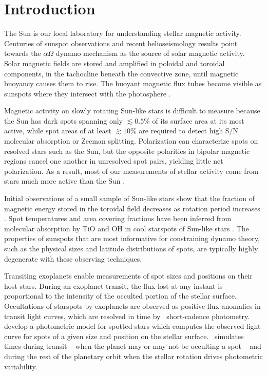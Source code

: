 

\section{Introduction}

The Sun is our local laboratory for understanding stellar magnetic activity. Centuries of sunspot observations and recent helioseismology results point towards the $\alpha\Omega$ dynamo mechanism as the source of solar magnetic activity. Solar magnetic fields are stored and amplified in poloidal and toroidal components, in the tachocline beneath the convective zone, until magnetic buoyancy causes them to rise. The buoyant magnetic flux tubes become visible as sunspots where they intersect with the photosphere \citetext{\citealp{Parker1955a, Parker1955b, Babcock1961}; \citealp[see reviews by][]{Charbonneau2010, Cheung2014, Hathaway2015}}. 

Magnetic activity on slowly rotating Sun-like stars is difficult to measure \citep{Saar1990} because the Sun has dark spots spanning only $\lesssim 0.5\%$ of its surface area at its most active, while spot areas of at least $\gtrsim 10\%$ are required to detect high S/N molecular absorption or Zeeman splitting. Polarization can characterize spots on resolved stars such as the Sun, but the opposite polarities in bipolar magnetic regions cancel one another in unresolved spot pairs, yielding little net polarization. As a result, most of our measurements of stellar activity come from stars much more active than the Sun \citep[see reviews by][]{Berdyugina2005, Reiners2012}.

Initial observations of a small sample of Sun-like stars show that the fraction of magnetic energy stored in the toroidal field decreases as rotation period increases \citep{Petit2008}. Spot temperatures and area covering fractions have been inferred from molecular absorption by TiO and OH in cool starspots of Sun-like stars \citep{Neff1995, oneal1996, ONeal2001, ONeal2004}.  The properties of sunspots that are most informative for constraining dynamo theory, such as the physical sizes and latitude distributions of spots, are typically highly degenerate with these observing techniques.

Transiting exoplanets enable measurements of spot sizes and positions on their host stars. During an exoplanet transit, the flux lost at any instant is proportional to the intensity of the occulted portion of the stellar surface. Occultations of starspots by exoplanets are observed as positive flux anomalies in transit light curves, which are resolved in time by \kepler\ short-cadence photometry. \cite{Hebb2017} develop a photometric model for spotted stars which computes the observed light curve for spots of a given size and position on the stellar surface. \stsp\ simulates times during transit -- when the planet may or may not be occulting a spot -- and during the rest of the planetary orbit when the stellar rotation drives photometric variability.

